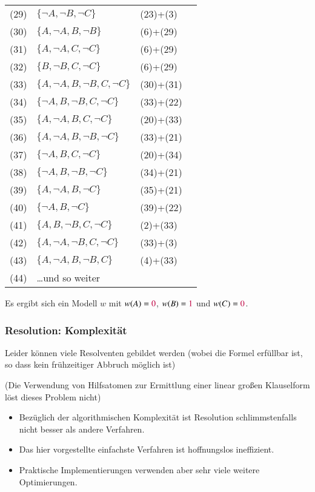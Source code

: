 \documentclass[onlymath]{beamer}
\begin{document}
\begin{frame}
\begin{minipage}{5cm}
{\begin{tabular}[t]{rlll}
%
(29) & $\{\neg A,\neg B,\neg C\}$ & (23)+(3)\\
(30) & $\{A,\neg A,B,\neg B\}$ & (6)+(29)\\
(31) & $\{A,\neg A,C,\neg C\}$ & (6)+(29)\\
(32) & $\{B,\neg B,C,\neg C\}$ & (6)+(29)\\
%
(33) & $\{A,\neg A, B,\neg B,C,\neg C\}$ & (30)+(31)\\
(34) & $\{\neg A, B,\neg B,C,\neg C\}$ & (33)+(22)\\
(35) & $\{A, \neg A, B,C,\neg C\}$ & (20)+(33)\\
(36) & $\{A, \neg A, B,\neg B,\neg C\}$ & (33)+(21)\\
(37) & $\{\neg A, B,C,\neg C\}$ & (20)+(34)\\
(38) & $\{\neg A, B,\neg B,\neg C\}$ & (34)+(21)\\
(39) & $\{A, \neg A, B,\neg C\}$ & (35)+(21)\\
(40) & $\{\neg A, B,\neg C\}$ & (39)+(22)\\
(41) & $\{A, B,\neg B,C,\neg C\}$ & (2)+(33)\\
(42) & $\{A,\neg A, \neg B,C,\neg C\}$ & (33)+(3)\\
(43) & $\{A,\neg A, B,\neg B,C\}$ & (4)+(33)\\
(44) & \ldots und so weiter
\end{tabular}}\pause
\vspace{5mm}

Es ergibt sich ein Modell $w$ mit
$w(A)=\textcolor{purple}{0}$, $w(B)=\textcolor{purple}{1}$ und $w(C)=\textcolor{purple}{0}$.
\end{minipage}

\end{frame}

\begin{frame}\frametitle{Resolution: Komplexität}

Leider können  viele Resolventen gebildet werden
(wobei die Formel erfüllbar ist, so dass kein frühzeitiger Abbruch möglich ist)
\bigskip

\textcolor{devilscss}{(Die Verwendung von Hilfsatomen zur Ermittlung einer linear großen Klauselform löst dieses Problem nicht)}
\bigskip

\begin{itemize}
\item Bezüglich der algorithmischen Komplexität ist Resolution schlimmstenfalls
\alert{nicht besser als andere Verfahren}.
\item Das hier vorgestellte einfachste Verfahren ist \alert{hoffnungslos ineffizient}.
\item Praktische Implementierungen verwenden aber sehr \alert{viele weitere Optimierungen}.
\end{itemize}

\end{frame}
\end{document}

